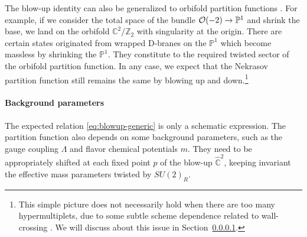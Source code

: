 \documentclass[letterpaper, 11pt]{article}
\def\IC{\mathbb{C}}
\def\IP{\mathbb{P}}
\def\IZ{\mathbb{Z}}
\def\CO{{\cal O}}
\begin{document}
The blow-up identity can also be generalized to orbifold partition functions \cite{Sasaki:2006vq,Bonelli:2012ny,Ito:2013kpa}. For example, if we consider the total space of the bundle $\CO(-2) \to \IP^1$ and shrink the base, we land on the orbifold $\IC^2/\IZ_2$ with singularity at the origin. There are certain states originated from wrapped D-branes on the $\IP^1$ which become massless by shrinking the $\IP^1$. They constitute to the required twisted sector of the orbifold partition function. In any case, we expect that the Nekrasov partition function still remains the same by blowing up and down.\footnote{This simple picture does not necessarily hold when there are too many hypermultiplets, due to some subtle scheme dependence related to wall-crossing \cite{Gottsche:2006bm,Gottsche:2006tn, Ito:2013kpa}. We will discuss about this issue in Section~\ref{}.}



\paragraph{Background parameters}

The expected relation \eqref{eq:blowup-generic} is only a schematic expression.
The partition function also depends on some background parameters, such as the gauge coupling  $\Lambda$ and flavor chemical potentials $m$. They need to be appropriately shifted at each fixed point $p$ of the blow-up $\hat{\IC}^2$, keeping invariant the effective mass parameters twisted by $SU(2)_R$.
\end{document}

